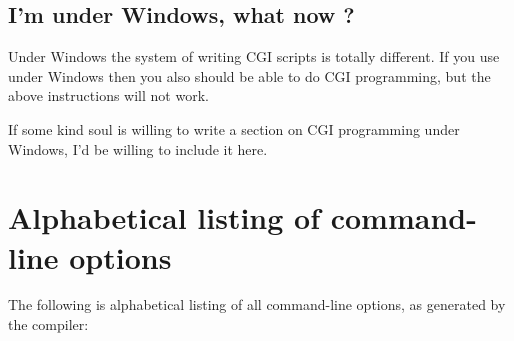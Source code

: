 \documentclass{report}
\begin{document}
\section{I'm under Windows, what now ?}
Under Windows the system of writing CGI scripts is totally different. If you
use \fpc under Windows then you also should be able to do CGI programming,
but the above instructions will not work. 

If some kind soul is willing to write a section on CGI programming under
Windows, I'd be willing to include it here.
\appendix



\chapter{Alphabetical listing of command-line options}
The following is alphabetical listing of all command-line options, as
generated by the compiler:
\end{document}
